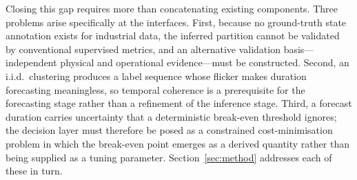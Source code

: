 \noindent
Closing this gap requires more than concatenating existing components.
Three problems arise specifically at the interfaces. First, because no
ground-truth state annotation exists for industrial data, the inferred
partition cannot be validated by conventional supervised metrics, and an
alternative validation basis---independent physical and operational
evidence---must be constructed. Second, an i.i.d.\ clustering produces a
label sequence whose flicker makes duration forecasting meaningless,
so temporal coherence is a prerequisite for the forecasting stage rather
than a refinement of the inference stage. Third, a forecast duration
carries uncertainty that a deterministic break-even threshold ignores;
the decision layer must therefore be posed as a constrained
cost-minimisation problem in which the break-even point emerges as a
derived quantity rather than being supplied as a tuning parameter.
Section~\ref{sec:method} addresses each of these in turn.
